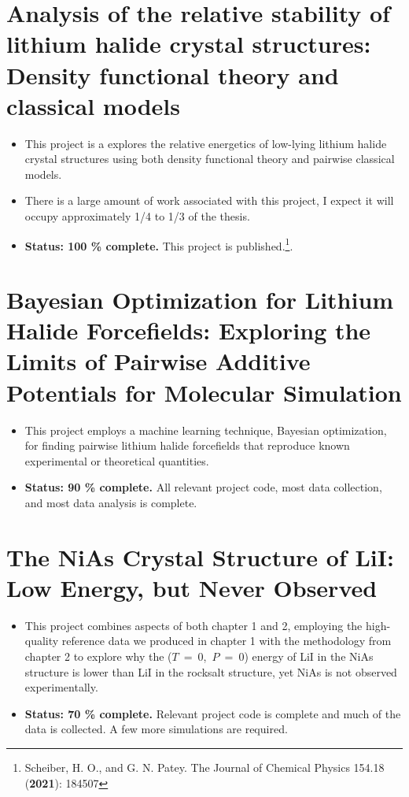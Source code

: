 \documentclass[titlepage,11pt]{article}
\begin{document}

\justifying

\section{Analysis of the relative stability of lithium halide crystal structures: Density functional theory and classical models}

\begin{itemize}
	\item This project is a explores the relative energetics of low-lying lithium halide crystal structures using both density functional theory and pairwise classical models.
	\item There is a large amount of work associated with this project, I expect it will occupy approximately 1/4 to 1/3 of the thesis.
	\item \textbf{Status: 100 \% complete.} This project is published.\footnote{Scheiber, H. O., and G. N. Patey. The Journal of Chemical Physics 154.18 (\textbf{2021}): 184507}.
\end{itemize}


\section{Bayesian Optimization for Lithium Halide Forcefields: Exploring the Limits of Pairwise Additive Potentials for Molecular Simulation}

\begin{itemize}
	\item This project employs a machine learning technique, Bayesian optimization, for finding pairwise lithium halide forcefields that reproduce known experimental or theoretical quantities.
	\item \textbf{Status: 90 \% complete.} All relevant project code, most data collection, and most data analysis is complete.
\end{itemize}


\section{The NiAs Crystal Structure of LiI: Low Energy, but Never Observed}

\begin{itemize}
	\item This project combines aspects of both chapter 1 and 2, employing the high-quality reference data we produced in chapter 1 with the methodology from chapter 2 to explore why the \mbox{($T$ = 0, $P$ = 0)} energy of LiI in the NiAs structure is lower than LiI in the rocksalt structure, yet NiAs is not observed experimentally.
	\item \textbf{Status: 70 \% complete.} Relevant project code is complete and much of the data is collected. A few more simulations are required.
\end{itemize}
\end{document}
